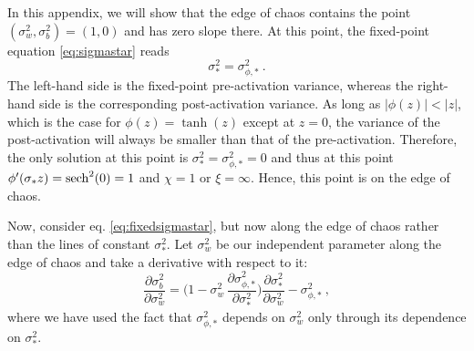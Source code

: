In this appendix, we will show that the edge of chaos contains the point $( \sigma_{w}^{2} , \sigma_{b}^{2} ) = (1,0)$ and has zero slope there. At this point, the fixed-point equation \eqref{eq:sigmastar} reads
%
\begin{equation}
	\sigma_{*}^{2} = \sigma_{\phi , *}^{2}~. 
\end{equation}
%
The left-hand side is the fixed-point pre-activation variance, whereas the right-hand side is the corresponding post-activation variance. As long as $| \phi (z) | < |z|$, which is the case for $\phi (z) = \tanh (z)$ except at $z=0$, the variance of the post-activation will always be smaller than that of the pre-activation. Therefore, the only solution at this point is $\sigma_{*}^{2} = \sigma_{\phi, *}^{2} = 0$ and thus at this point $\phi' ( \sigma_* z ) = \sech^2 (0) = 1$ and $\chi = 1$ or $\xi = \infty$. Hence, this point is on the edge of chaos.

Now, consider eq. \eqref{eq:fixedsigmastar}, but now along the edge of chaos rather than the lines of constant $\sigma_{*}^{2}$. Let $\sigma_{w}^{2}$ be our independent parameter along the edge of chaos and take a derivative with respect to it:
%
\begin{equation} \label{eq:derrel}
	\frac{\partial \sigma_{b}^{2}}{\partial \sigma_{w}^{2}} = \biggl( 1 - \sigma_{w}^{2} \, \frac{\partial \sigma_{\phi , *}^{2}}{\partial \sigma_{*}^{2}} \biggr) \frac{\partial \sigma_{*}^{2}}{\partial \sigma_{w}^{2}} - \sigma_{\phi , *}^{2}~,
\end{equation}
%
where we have used the fact that $\sigma_{\phi , *}^{2}$ depends on $\sigma_{w}^{2}$ only through its dependence on $\sigma_{*}^{2}$.

